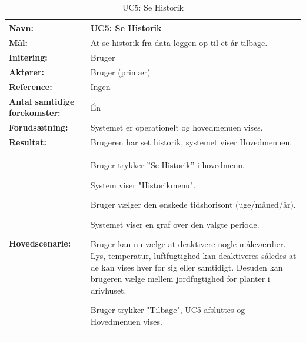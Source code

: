 \begin{table}[h]
\begin{tabularx}{\textwidth}{| >{\raggedright\arraybackslash}p{3.3 cm} | >{\raggedright\arraybackslash}X |} \hline

\textbf{Navn:} 						& UC5: Se Historik\\ \hline
\textbf{Mål:}						& At se historik fra data loggen op til et år tilbage. \\ \hline
\textbf{Initering:}					& Bruger \\ \hline
\textbf{Aktører:} 					& Bruger (primær) \\ \hline
\textbf{Reference:} 					& Ingen \\ \hline
\textbf{Antal samtidige forekomster:} & Én \\ \hline
\textbf{Forudsætning:} 				& Systemet er operationelt og hovedmenuen vises. \\ \hline
\textbf{Resultat:}					& Brugeren har set historik, systemet viser Hovedmenuen. \\ \hline
\textbf{Hovedscenarie:}				& 

\begin{packed_enum}
\item Bruger trykker ”Se Historik” i hovedmenu.
\item System viser "Historikmenu". 
\item Bruger vælger den ønskede tidshorisont (uge/måned/år).
\item Systemet viser en graf over den valgte periode.
\item Bruger kan nu vælge at deaktivere nogle måleværdier. Lys, temperatur, luftfugtighed kan deaktiveres således at de kan vises hver for sig eller samtidigt. Desuden kan brugeren vælge mellem jordfugtighed for planter i drivhuset.
\item Bruger trykker "Tilbage", UC5 afsluttes og Hovedmenuen vises.
\end{packed_enum} \\ \hline
\end{tabularx}
\caption{UC5: Se Historik}
\label{tbl:UC5}
\end{table}

\clearpage


